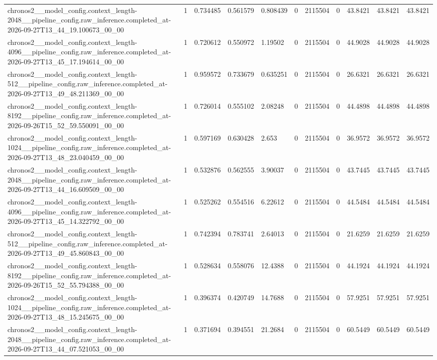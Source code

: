 \begin{tabular}{lllllllllll}
chronos2\_\_model\_config.context\_length-2048\_\_pipeline\_config.raw\_inference.completed\_at-2026-09-27T13\_44\_19.100673\_00\_00 & 1 & 0.734485 & 0.561579 & 0.808439 & 0 & 2115504 & 0 & 43.8421 & 43.8421 & 43.8421 \\
chronos2\_\_model\_config.context\_length-4096\_\_pipeline\_config.raw\_inference.completed\_at-2026-09-27T13\_45\_17.194614\_00\_00 & 1 & 0.720612 & 0.550972 & 1.19502 & 0 & 2115504 & 0 & 44.9028 & 44.9028 & 44.9028 \\
chronos2\_\_model\_config.context\_length-512\_\_pipeline\_config.raw\_inference.completed\_at-2026-09-27T13\_49\_48.211369\_00\_00 & 1 & 0.959572 & 0.733679 & 0.635251 & 0 & 2115504 & 0 & 26.6321 & 26.6321 & 26.6321 \\
chronos2\_\_model\_config.context\_length-8192\_\_pipeline\_config.raw\_inference.completed\_at-2026-09-26T15\_52\_59.550091\_00\_00 & 1 & 0.726014 & 0.555102 & 2.08248 & 0 & 2115504 & 0 & 44.4898 & 44.4898 & 44.4898 \\
chronos2\_\_model\_config.context\_length-1024\_\_pipeline\_config.raw\_inference.completed\_at-2026-09-27T13\_48\_23.040459\_00\_00 & 1 & 0.597169 & 0.630428 & 2.653 & 0 & 2115504 & 0 & 36.9572 & 36.9572 & 36.9572 \\
chronos2\_\_model\_config.context\_length-2048\_\_pipeline\_config.raw\_inference.completed\_at-2026-09-27T13\_44\_16.609509\_00\_00 & 1 & 0.532876 & 0.562555 & 3.90037 & 0 & 2115504 & 0 & 43.7445 & 43.7445 & 43.7445 \\
chronos2\_\_model\_config.context\_length-4096\_\_pipeline\_config.raw\_inference.completed\_at-2026-09-27T13\_45\_14.322792\_00\_00 & 1 & 0.525262 & 0.554516 & 6.22612 & 0 & 2115504 & 0 & 44.5484 & 44.5484 & 44.5484 \\
chronos2\_\_model\_config.context\_length-512\_\_pipeline\_config.raw\_inference.completed\_at-2026-09-27T13\_49\_45.860843\_00\_00 & 1 & 0.742394 & 0.783741 & 2.64013 & 0 & 2115504 & 0 & 21.6259 & 21.6259 & 21.6259 \\
chronos2\_\_model\_config.context\_length-8192\_\_pipeline\_config.raw\_inference.completed\_at-2026-09-26T15\_52\_55.794388\_00\_00 & 1 & 0.528634 & 0.558076 & 12.4388 & 0 & 2115504 & 0 & 44.1924 & 44.1924 & 44.1924 \\
chronos2\_\_model\_config.context\_length-1024\_\_pipeline\_config.raw\_inference.completed\_at-2026-09-27T13\_48\_15.245675\_00\_00 & 1 & 0.396374 & 0.420749 & 14.7688 & 0 & 2115504 & 0 & 57.9251 & 57.9251 & 57.9251 \\
chronos2\_\_model\_config.context\_length-2048\_\_pipeline\_config.raw\_inference.completed\_at-2026-09-27T13\_44\_07.521053\_00\_00 & 1 & 0.371694 & 0.394551 & 21.2684 & 0 & 2115504 & 0 & 60.5449 & 60.5449 & 60.5449 \\

\end{tabular}
